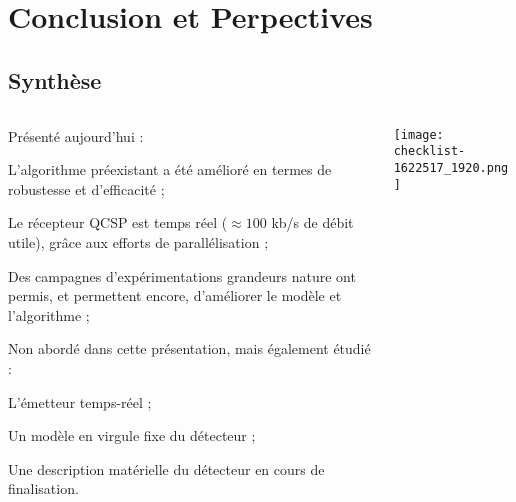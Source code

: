 \documentclass[../main.tex]{subfiles}
\begin{document}
\section{Conclusion et Perpectives}

\subsection{Synthèse}

\begin{frame}{\subsecname}
  \begin{columns}
    \begin{column}{.7 \linewidth}
      Présenté aujourd'hui :
      \begin{ctrlitemize}{.2 em} \small
        \item L'algorithme préexistant a été amélioré en termes de robustesse et d'efficacité ;
        \item Le  récepteur QCSP est temps réel ($\approx 100$ kb/s de débit utile), grâce aux efforts de parallélisation ;
        \item Des campagnes d'expérimentations grandeurs nature ont permis, et permettent encore, d'améliorer le modèle et l'algorithme ;
      \end{ctrlitemize} \vspace{1 em}

      Non abordé dans cette présentation, mais également étudié :
      \begin{ctrlitemize}{.2 em} \small
        \item L'émetteur temps-réel ;
        \item Un modèle en virgule fixe du détecteur ;
        \item Une description matérielle du détecteur en cours de finalisation.
      \end{ctrlitemize}
    \end{column}
    \begin{column}{.3 \linewidth}
      \texttt{[image: checklist-1622517\_1920.png]}
    \end{column}
  \end{columns}
\end{frame}
\end{document}
